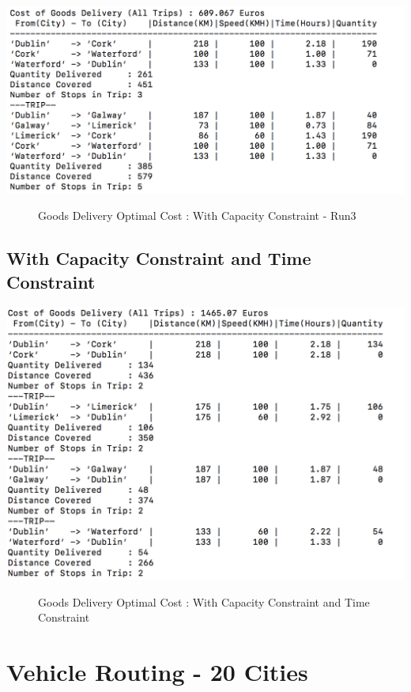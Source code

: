 \documentclass[a4paper&11pt]{article}
\begin{document}
\begin{center}
\includegraphics[scale=0.8]{fig3.png}
\begin{figure}[H]
\caption{Goods Delivery Optimal Cost :  With Capacity Constraint - Run3}
\end{figure}
\end{center}

\subsection*{With Capacity Constraint and Time Constraint}

\begin{center}
\includegraphics[scale=0.8]{fig4.png}
\begin{figure}[H]
\caption{Goods Delivery Optimal Cost :  With Capacity Constraint  and Time Constraint}
\end{figure}
\end{center}

\section*{Vehicle Routing  - 20 Cities}
\end{document}
